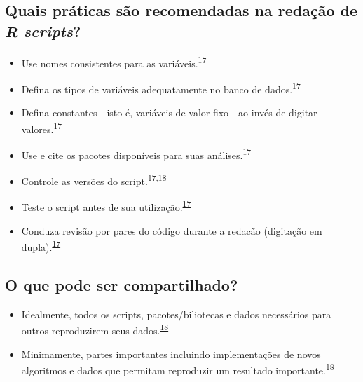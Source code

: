 \documentclass[
]{book}
\begin{document}
\hypertarget{quais-pruxe1ticas-suxe3o-recomendadas-na-redauxe7uxe3o-de-r-scripts}{%
\subsection{\texorpdfstring{Quais práticas são recomendadas na redação de \emph{R scripts}?}{Quais práticas são recomendadas na redação de R scripts?}}\label{quais-pruxe1ticas-suxe3o-recomendadas-na-redauxe7uxe3o-de-r-scripts}}

\begin{itemize}
\item
  Use nomes consistentes para as variáveis.\textsuperscript{\protect\hyperlink{ref-SchwabSimon2021}{17}}
\item
  Defina os tipos de variáveis adequatamente no banco de dados.\textsuperscript{\protect\hyperlink{ref-SchwabSimon2021}{17}}
\item
  Defina constantes - isto é, variáveis de valor fixo - ao invés de digitar valores.\textsuperscript{\protect\hyperlink{ref-SchwabSimon2021}{17}}
\item
  Use e cite os pacotes disponíveis para suas análises.\textsuperscript{\protect\hyperlink{ref-SchwabSimon2021}{17}}
\item
  Controle as versões do script.\textsuperscript{\protect\hyperlink{ref-SchwabSimon2021}{17},\protect\hyperlink{ref-Eglen2017}{18}}
\item
  Teste o script antes de sua utilização.\textsuperscript{\protect\hyperlink{ref-SchwabSimon2021}{17}}
\item
  Conduza revisão por pares do código durante a redacão (digitação em dupla).\textsuperscript{\protect\hyperlink{ref-SchwabSimon2021}{17}}
\end{itemize}

\hypertarget{o-que-pode-ser-compartilhado}{%
\subsection{O que pode ser compartilhado?}\label{o-que-pode-ser-compartilhado}}

\begin{itemize}
\item
  Idealmente, todos os scripts, pacotes/biliotecas e dados necessários para outros reproduzirem seus dados.\textsuperscript{\protect\hyperlink{ref-Eglen2017}{18}}
\item
  Minimamente, partes importantes incluindo implementações de novos algoritmos e dados que permitam reproduzir um resultado importante.\textsuperscript{\protect\hyperlink{ref-Eglen2017}{18}}
\end{itemize}
\end{document}
